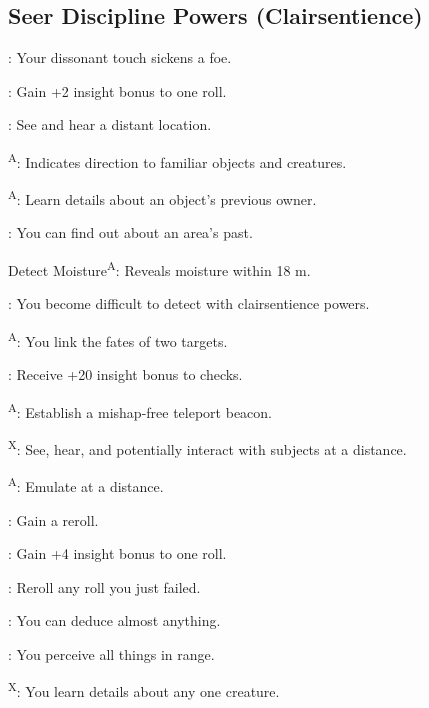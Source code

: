 \subsection{Seer Discipline Powers {\normalsize(Clairsentience)}}
\begin{enumerate*}
\item {}: Your dissonant touch sickens a foe.

: Gain +2 insight bonus to one roll.

\item {}: See and hear a distant location.

\textsuperscript{A}: Indicates direction to familiar objects and creatures. %

\textsuperscript{A}: Learn details about an object's previous owner.

: You can find out about an area's past.

\item Detect Moisture\textsuperscript{A}: Reveals moisture within 18 m. %

: You become difficult to detect with clairsentience powers.

\textsuperscript{A}: You link the fates of two targets.

: Receive +20 insight bonus to  checks. %

\item {}\textsuperscript{A}: Establish a mishap-free teleport beacon.

\textsuperscript{X}: See, hear, and potentially interact with 
subjects at a distance.
\item {}\textsuperscript{A}: Emulate  at a distance.

: Gain a reroll.

\item {}: Gain +4 insight bonus to one roll.
\item {}: Reroll any roll you just failed.
\item {}: You can deduce almost anything.
\item {}: You perceive all things in range. %

\textsuperscript{X}: You learn details about any one creature.
\end{enumerate*}



